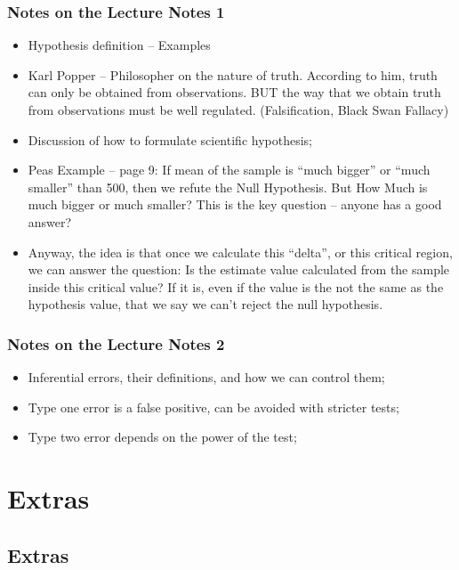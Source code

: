 \documentclass[t]{beamer}
\begin{document}
\begin{frame}
  \frametitle{Notes on the Lecture Notes 1}
  {\smaller
    \begin{itemize}
    \item Hypothesis definition -- Examples
    \item Karl Popper -- Philosopher on the nature of truth. According
      to him, truth can only be obtained from
      observations. \alert{BUT} the way that we obtain truth from
      observations must be well regulated. (Falsification, Black Swan Fallacy)
    \item Discussion of how to formulate scientific hypothesis;
    \item Peas Example -- page 9: If mean of the sample is ``much
      bigger'' or ``much smaller'' than 500, then we refute the Null
      Hypothesis. But \alert{How Much} is much bigger or much smaller?
      This is the key question -- anyone has a good answer?
    \item Anyway, the idea is that once we calculate this ``delta'',
      or this critical region, we can answer the question: Is the
      estimate value calculated from the sample inside this critical
      value? If it is, even if the value is the not the same as the
      hypothesis value,  that we say we
      can't reject the null hypothesis.
    \end{itemize}
  }
\end{frame}

\begin{frame}
  \frametitle{Notes on the Lecture Notes 2}
  {\smaller
    \begin{itemize}
    \item Inferential errors, their definitions, and how we can
      control them;
    \item Type one error is a false positive, can be avoided with
      stricter tests;
    \item Type two error depends on the power of the test;
    \end{itemize}
  }
\end{frame}




\section{Extras}
\subsection{Extras}
\end{document}
